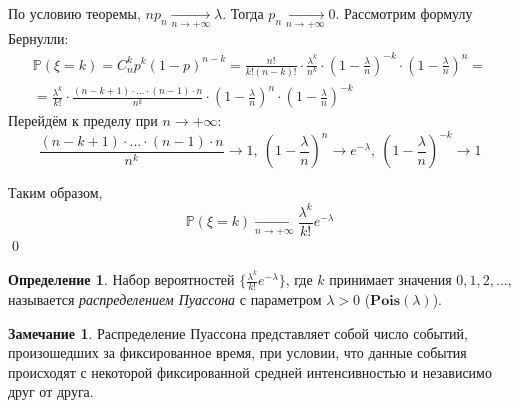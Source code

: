 \documentclass[oneside,final,14pt]{extreport}
\renewenvironment{proof}{{\bfseries Доказательство.}}{\qed}
\theoremstyle{plain}
\theoremstyle{definition}
\newtheorem*{defn}{Определение}
\newtheorem*{rmrk}{Замечание}
\theoremstyle{named}
\begin{document}
\begin{proof}
    По условию теоремы, $n p_n \xrightarrow[n \rightarrow +\infty]{} \lambda$. Тогда $p_n \xrightarrow[n \rightarrow +\infty]{} 0$. Рассмотрим формулу Бернулли:
    \begin{multline*}
        \mathbb{P}(\xi = k) = C_n^k p^k (1 - p)^{n-k} = \frac{n!}{k!(n - k)!} \cdot \frac{\lambda^k}{n^k} \cdot \left(1 - \frac{\lambda}{n}\right)^{-k} \cdot \left(1 - \frac{\lambda}{n}\right)^n = \\
        = \frac{\lambda^k}{k!} \cdot \frac{(n - k + 1) \cdot ... \cdot (n - 1) \cdot n}{n^k} \cdot \left( 1 - \frac{\lambda}{n}\right)^n \cdot \left(1 - \frac{\lambda}{n}\right)^{-k}
    \end{multline*}
    Перейдём к пределу при $n \rightarrow +\infty$:
    \begin{equation*}
        \frac{(n - k + 1) \cdot ... \cdot (n - 1) \cdot n}{n^k} \to 1,~ \left( 1 - \frac{\lambda}{n}\right)^n \to e^{-\lambda},~ \left(1 - \frac{\lambda}{n}\right)^{-k} \to 1
    \end{equation*}
    
    Таким образом, 
    \begin{equation*}
        \mathbb{P}(\xi = k) \xrightarrow[n \rightarrow +\infty]{} \frac{\lambda^k}{k!} e^{-\lambda}
    \end{equation*}
\end{proof}

\begin{defn}
    Набор вероятностей $\{ \frac{\lambda^k}{k!} e^{-\lambda} \}$, где $k$ принимает значения $0, 1, 2, ...$, называется {\it распределением Пуассона} с параметром $\lambda > 0$ ($\mathbf{Pois}(\lambda)$).
\end{defn}
\begin{rmrk}
    Распределение Пуассона представляет собой число событий, произошедших за фиксированное время, при условии, что данные события происходят с некоторой фиксированной средней интенсивностью и независимо друг от друга.
\end{rmrk}
\end{document}

